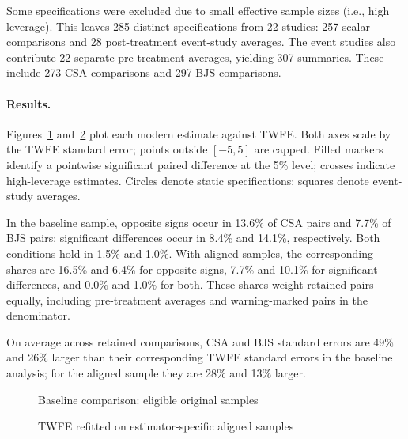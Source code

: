 \documentclass[11pt,letterpaper]{article}
\begin{document}
Some specifications were excluded due to small effective sample sizes (i.e., high leverage). This leaves 285 distinct specifications from 22 studies: 257 scalar comparisons and 28 post-treatment event-study averages. The event studies also contribute 22 separate pre-treatment averages, yielding 307 summaries. These include 273 CSA comparisons and 297 BJS comparisons.

\paragraph{Results.}
Figures~\ref{fig:baseline} and~\ref{fig:aligned} plot each modern estimate against TWFE. Both axes scale by the TWFE standard error; points outside $[-5,5]$ are capped. Filled markers identify a pointwise significant paired difference at the 5\% level; crosses indicate high-leverage estimates. Circles denote static specifications; squares denote event-study averages.

In the baseline sample, opposite signs occur in 13.6\% of CSA pairs and 7.7\% of BJS pairs; significant differences occur in 8.4\% and 14.1\%, respectively. Both conditions hold in 1.5\% and 1.0\%. With aligned samples, the corresponding shares are 16.5\% and 6.4\% for opposite signs, 7.7\% and 10.1\% for significant differences, and 0.0\% and 1.0\% for both. These shares weight retained pairs equally, including pre-treatment averages and warning-marked pairs in the denominator. 

On average across retained comparisons, CSA and BJS standard errors are 49\% and 26\% larger than their corresponding TWFE standard errors in the baseline analysis; for the aligned sample they are 28\% and 13\% larger. 


\clearpage
\setlength{\parskip}{0.55em}
\begin{landscape}
\begin{figure}[p]
\centering
\caption{Baseline comparison: eligible original samples}
\label{fig:baseline}
\begin{lrbox}{\writeupfigure}

\end{lrbox}
\noindent\resizebox{!}{6.85in}{\usebox{\writeupfigure}}
\end{figure}
\end{landscape}
\clearpage
\begin{landscape}
\begin{figure}[p]
\centering
\caption{TWFE refitted on estimator-specific aligned samples}
\label{fig:aligned}
\begin{lrbox}{\writeupfigure}

\end{lrbox}
\noindent\resizebox{!}{6.85in}{\usebox{\writeupfigure}}
\end{figure}
\end{landscape}
\restoregeometry
\clearpage
\end{document}
